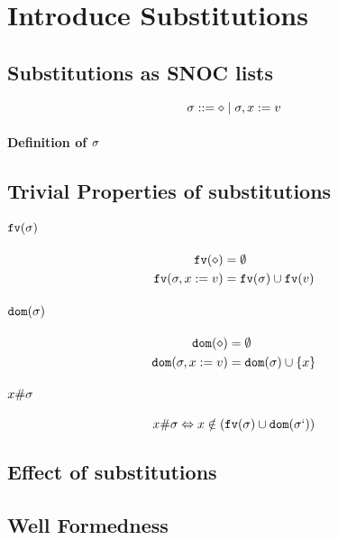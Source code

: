 \documentclass{report}
\begin{document}
\section{Introduce Substitutions}
\subsection{Substitutions as SNOC lists}

\begin{equation}
    \sigma ::= \diamond \mid \sigma, x := v
\end{equation}

\paragraph{Definition of $\sigma$}
\subsection{Trivial Properties of substitutions}
\paragraph{$\texttt{fv}(\sigma)$}
\begin{align}
    \texttt{fv}(\diamond) &= \emptyset\\
    \texttt{fv}(\sigma, x:= v) &= \texttt{fv}(\sigma)\cup\texttt{fv}(v)
\end{align}
\paragraph{$\texttt{dom}(\sigma)$}
\begin{align}
    \texttt{dom}(\diamond) & = \emptyset\\
    \texttt{dom}(\sigma, x:= v) & = \texttt{dom}(\sigma)\cup\left\{x\right\}
\end{align}

\paragraph{$x \# \sigma$}
\begin{equation}
    x \# \sigma \Leftrightarrow x\notin(\texttt{fv}(\sigma)\cup\texttt{dom}(\sigma`))
\end{equation}

\subsection{Effect of substitutions}
\subsection{Well Formedness}
\end{document}
